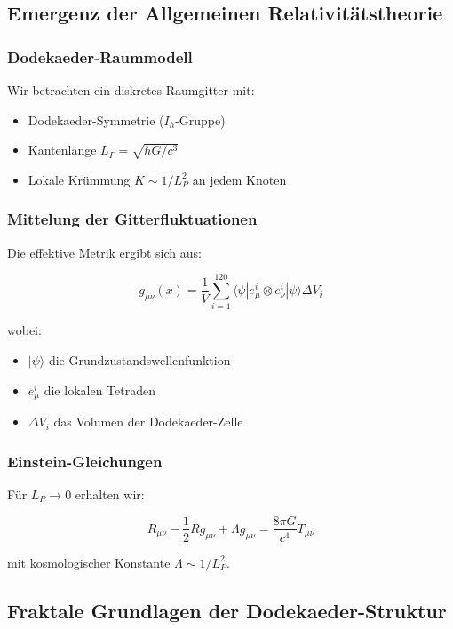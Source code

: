 \subsection{Emergenz der Allgemeinen Relativitätstheorie}
\label{subsec:art_emergence}

\subsubsection{Dodekaeder-Raummodell}
Wir betrachten ein diskretes Raumgitter mit:
\begin{itemize}
\item Dodekaeder-Symmetrie ($I_h$-Gruppe)
\item Kantenlänge $L_P = \sqrt{\hbar G/c^3}$
\item Lokale Krümmung $K \sim 1/L_P^2$ an jedem Knoten
\end{itemize}

\subsubsection{Mittelung der Gitterfluktuationen}
Die effektive Metrik ergibt sich aus:

\begin{equation}
g_{\mu\nu}(x) = \frac{1}{V}\sum_{i=1}^{120} \langle \psi|e_\mu^i \otimes e_\nu^i|\psi\rangle \Delta V_i
\end{equation}

wobei:
\begin{itemize}
\item $|\psi\rangle$ die Grundzustandswellenfunktion
\item $e_\mu^i$ die lokalen Tetraden
\item $\Delta V_i$ das Volumen der Dodekaeder-Zelle
\end{itemize}

\subsubsection{Einstein-Gleichungen}
Für $L_P \to 0$ erhalten wir:

\begin{equation}
R_{\mu\nu} - \frac{1}{2}Rg_{\mu\nu} + \Lambda g_{\mu\nu} = \frac{8\pi G}{c^4}T_{\mu\nu}
\end{equation}

mit kosmologischer Konstante $\Lambda \sim 1/L_P^2$.

\subsection{Fraktale Grundlagen der Dodekaeder-Struktur}
\label{subsec:fractal}

